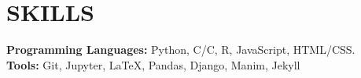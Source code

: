 \documentclass[letterpaper, 9pt]{extarticle}
\newcommand{\CPP}{C\nolinebreak\hspace{-.05em}\raisebox{.4ex}{\tiny\bf +}\nolinebreak\hspace{-.10em}\raisebox{.4ex}{\tiny\bf +}}
\begin{document}


   

\section*{SKILLS}
\textbf{Programming Languages:} Python, C/\CPP\@, R, JavaScript, HTML/CSS. \\
\textbf{Tools:} Git, Jupyter, \LaTeX, Pandas, Django, Manim, Jekyll
\end{document}
